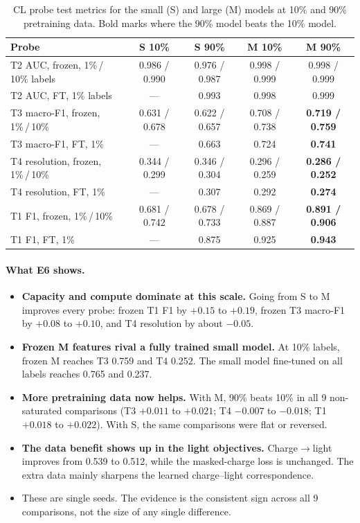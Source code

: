 \documentclass[11pt,a4paper]{article}
\newcommand{\best}[1]{\textbf{#1}}
\begin{document}
\begin{table}[h]
\centering\small
\caption{CL probe test metrics for the small (S) and large (M) models at 10\% and 90\% pretraining data. Bold marks where the 90\% model beats the 10\% model.}
\label{tab:e6}
\begin{tabular}{lcccc}
\toprule
Probe & S 10\% & S 90\% & M 10\% & M 90\% \\
\midrule
T2 AUC, frozen, 1\%\,/\,10\% labels & 0.986 / 0.990 & 0.976 / 0.987 & 0.998 / 0.999 & 0.998 / 0.999 \\
T2 AUC, FT, 1\% labels & --- & 0.993 & 0.998 & 0.999 \\
T3 macro-F1, frozen, 1\%\,/\,10\% & 0.631 / 0.678 & 0.622 / 0.657 & 0.708 / 0.738 & \best{0.719 / 0.759} \\
T3 macro-F1, FT, 1\% & --- & 0.663 & 0.724 & \best{0.741} \\
T4 resolution, frozen, 1\%\,/\,10\% & 0.344 / 0.299 & 0.346 / 0.304 & 0.296 / 0.259 & \best{0.286 / 0.252} \\
T4 resolution, FT, 1\% & --- & 0.307 & 0.292 & \best{0.274} \\
T1 F1, frozen, 1\%\,/\,10\% & 0.681 / 0.742 & 0.678 / 0.733 & 0.869 / 0.887 & \best{0.891 / 0.906} \\
T1 F1, FT, 1\% & --- & 0.875 & 0.925 & \best{0.943} \\
\bottomrule
\end{tabular}
\end{table}

\paragraph{What E6 shows.}
\begin{itemize}
  \item \textbf{Capacity and compute dominate at this scale.} Going from S to M improves every probe: frozen T1 F1 by $+0.15$ to $+0.19$, frozen T3 macro-F1 by $+0.08$ to $+0.10$, and T4 resolution by about $-0.05$.
  \item \textbf{Frozen M features rival a fully trained small model.} At 10\% labels, frozen M reaches T3 0.759 and T4 0.252. The small model fine-tuned on all labels reaches 0.765 and 0.237.
  \item \textbf{More pretraining data now helps.} With M, 90\% beats 10\% in all 9 non-saturated comparisons (T3 $+0.011$ to $+0.021$; T4 $-0.007$ to $-0.018$; T1 $+0.018$ to $+0.022$). With S, the same comparisons were flat or reversed.
  \item \textbf{The data benefit shows up in the light objectives.} Charge$\to$light improves from 0.539 to 0.512, while the masked-charge loss is unchanged. The extra data mainly sharpens the learned charge--light correspondence.
  \item These are single seeds. The evidence is the consistent sign across all 9 comparisons, not the size of any single difference.
\end{itemize}
\end{document}
